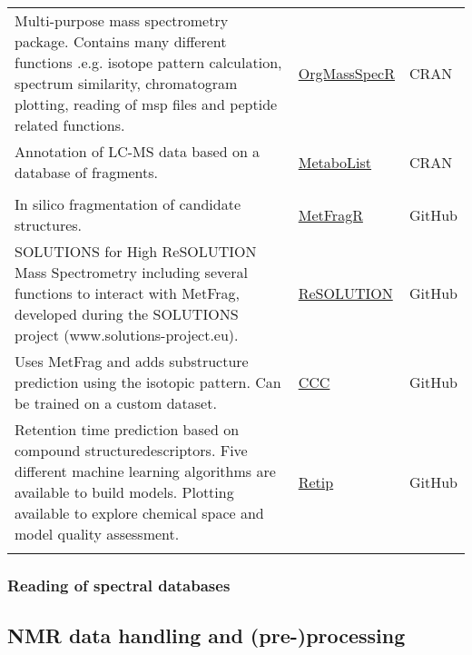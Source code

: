 \documentclass[]{article}
\begin{document}
\begin{longtable}{>{\raggedright\arraybackslash}p{30em}>{\raggedright\arraybackslash}p{10em}>{\raggedright\arraybackslash}p{3em}}
Multi-purpose mass spectrometry package. Contains many different functions .e.g. isotope pattern calculation, spectrum similarity, chromatogram plotting, reading of msp files and peptide related functions. & \href{https://cran.r-project.org/package=OrgMassSpecR}{OrgMassSpecR} & CRAN\\
\rowcolor{gray!6}  Annotation of LC-MS data based on a database of fragments. & \href{https://cran.r-project.org/package=MetaboList}{MetaboList} & CRAN\\
\addlinespace[0.3em]
\multicolumn{3}{l}{\textbf{In silico fragmentation}}\\
In silico fragmentation of candidate structures. & \href{https://github.com/c-ruttkies/MetFragR}{MetFragR} & GitHub\\
\rowcolor{gray!6}  SOLUTIONS for High ReSOLUTION Mass Spectrometry including several functions to interact with MetFrag, developed during the SOLUTIONS project (www.solutions-project.eu). & \href{https://github.com/schymane/ReSOLUTION}{ReSOLUTION} & GitHub\\
Uses MetFrag and adds substructure prediction using the isotopic pattern. Can be trained on a custom dataset. & \href{https://github.com/lucanard/CCC}{CCC} & GitHub\\
\rowcolor{gray!6}  Retention time prediction based on compound structuredescriptors. Five different machine learning algorithms are available to build models. Plotting available to explore chemical space and model quality assessment. & \href{https://github.com/PaoloBnn/Retip}{Retip} & GitHub\\*
\end{longtable}

\hypertarget{reading-of-spectral-databases}{%
\subsubsection{Reading of spectral databases}\label{reading-of-spectral-databases}}

\newpage

\hypertarget{nmr-data-handling-and-pre-processing}{%
\subsection{NMR data handling and (pre-)processing}\label{nmr-data-handling-and-pre-processing}}
\end{document}
